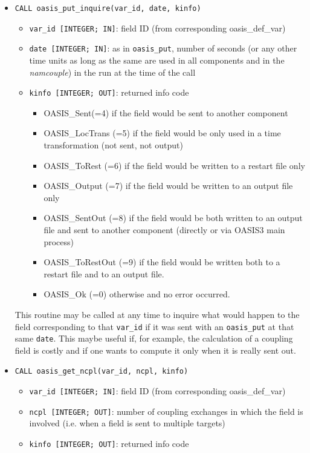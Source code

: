 \begin{itemize}
\item {\tt CALL oasis\_put\_inquire(var\_id, date, kinfo)}
  \begin{itemize}
  \item {\tt var\_id [INTEGER; IN]}: field ID (from
  corresponding oasis\_def\_var)
  \item {\tt date [INTEGER; IN]}: as in {\tt oasis\_put}, number of seconds (or any other time
    units as long as the same are used in all components and in the {\it
      namcouple}) in the run at the time of the call
  \item {\tt kinfo [INTEGER; OUT]}: returned info code
    \begin{itemize}
    \item OASIS\_Sent(=4) if the field would be sent to another component
    \item OASIS\_LocTrans (=5) if the field would be only used in a time
      transformation (not sent, not output)
    \item OASIS\_ToRest (=6) if the field would be written to a restart
      file only
    \item OASIS\_Output (=7) if the field would be written to an output
      file only
    \item OASIS\_SentOut (=8) if the field would be both written to an
      output file and sent to another component (directly or via OASIS3
      main process)
    \item OASIS\_ToRestOut (=9) if the field would be written both to a
      restart file and to an output file.
    \item OASIS\_Ok (=0) otherwise and no error occurred.
    \end{itemize}
  \end{itemize}

This routine may be called at any time to
inquire what would happen to the field corresponding to that
{\tt var\_id} if it was sent with an {\tt oasis\_put} at that same {\tt date}. This maybe useful if, for example, the calculation of
a coupling field is costly and if one wants to compute it only when it is
really sent out.

\item {\tt CALL oasis\_get\_ncpl(var\_id, ncpl, kinfo)}
  \begin{itemize}
  \item {\tt var\_id [INTEGER; IN]}: field ID (from
  corresponding oasis\_def\_var)
  \item {\tt ncpl [INTEGER; OUT]}: number of coupling exchanges in which the field
  is involved (i.e. when a field is sent to multiple targets)
  \item {\tt kinfo [INTEGER; OUT]}: returned info code
  \end{itemize}


\end{itemize}
